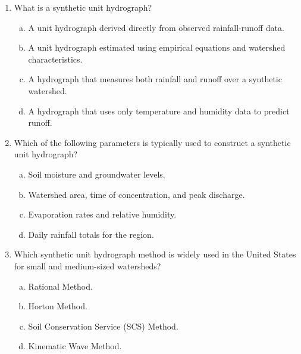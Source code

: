 \documentclass[12pt]{article}
\begin{document}
\begin{enumerate}
\begin{enumerate}[a)]
\begin{figure}[htbp]
   \caption{3-hour event comprised of 3 consecutive 1-hour events.}
   \label{fig:UnitHydrographOutput}
\end{figure}
\item What is the total volume (in $ft^3$) of runoff anticipated for the storm depicted in Figure \ref{fig:UnitHydrographOutput}?  \\
~\\
~\\
~\\
~\\
\item Plot the response to the 3 consecutive 1-hour events with the intensities indicated in Figure \ref{fig:UnitHydrographOutput}.
\end{enumerate}



\clearpage

\item What is a synthetic unit hydrograph?
\begin{enumerate}[a)]
\item A unit hydrograph derived directly from observed rainfall-runoff data.
\item A unit hydrograph estimated using empirical equations and watershed characteristics.
\item A hydrograph that measures both rainfall and runoff over a synthetic watershed.
\item A hydrograph that uses only temperature and humidity data to predict runoff.
\end{enumerate}

\item Which of the following parameters is typically used to construct a synthetic unit hydrograph?
\begin{enumerate}[a)]
\item Soil moisture and groundwater levels.
\item Watershed area, time of concentration, and peak discharge.
\item Evaporation rates and relative humidity.
\item Daily rainfall totals for the region.
\end{enumerate}

\item Which synthetic unit hydrograph method is widely used in the United States for small and medium-sized watersheds?
\begin{enumerate}[a)]
\item Rational Method.
\item Horton Method.
\item Soil Conservation Service (SCS) Method.
\item Kinematic Wave Method.
\end{enumerate}


\end{enumerate}
\end{document}
